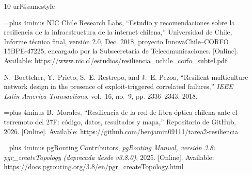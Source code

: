 \documentclass[conference]{IEEEtran}
\begin{document}
\begin{thebibliography}{10}
\providecommand{\url}[1]{#1}
\csname url@samestyle\endcsname
\providecommand{\newblock}{\relax}
\providecommand{\bibinfo}[2]{#2}
\providecommand{\BIBentrySTDinterwordspacing}{\spaceskip=0pt\relax}
\providecommand{\BIBentryALTinterwordstretchfactor}{4}
\providecommand{\BIBentryALTinterwordspacing}{\spaceskip=\fontdimen2\font plus
\BIBentryALTinterwordstretchfactor\fontdimen3\font minus
  \fontdimen4\font\relax}
\providecommand{\BIBforeignlanguage}[2]{{%
\expandafter\ifx\csname l@#1\endcsname\relax
\typeout{** WARNING: IEEEtran.bst: No hyphenation pattern has been}%
\typeout{** loaded for the language `#1'. Using the pattern for}%
\typeout{** the default language instead.}%
\else
\language=\csname l@#1\endcsname
\fi
#2}}
\providecommand{\BIBdecl}{\relax}
\BIBdecl

\BIBentryALTinterwordspacing
{NIC Chile Research Labs}, ``Estudio y recomendaciones sobre la resiliencia de
  la infraestructura de la internet chilena,'' Universidad de Chile, Informe
  técnico final, versión 2.0, Dec. 2018, proyecto InnovaChile--CORFO
  15BPE-47225, encargado por la Subsecretaría de Telecomunicaciones. [Online].
  Available:
  \url{https://www.nic.cl/estudios/resiliencia_uchile_corfo_subtel.pdf}
\BIBentrySTDinterwordspacing

N.~Boettcher, Y.~Prieto, S.~E. Restrepo, and J.~E. Pezoa, ``Resilient
  multiculture network design in the presence of exploit-triggered correlated
  failures,'' \emph{IEEE Latin America Transactions}, vol.~16, no.~9, pp.
  2336--2343, 2018.

\BIBentryALTinterwordspacing
B.~Morales, ``Resiliencia de la red de fibra {\'o}ptica chilena ante el
  terremoto del 27{F}: c{\'o}digo, datos, resultados y mapa,'' Repositorio de
  GitHub, 2026. [Online]. Available:
  \url{https://github.com/benjamin09111/tarea2-resiliencia}
\BIBentrySTDinterwordspacing

\BIBentryALTinterwordspacing
{pgRouting Contributors}, \emph{pgRouting Manual, versión 3.8:
  pgr\_createTopology (deprecada desde v3.8.0)}, 2025. [Online]. Available:
  \url{https://docs.pgrouting.org/3.8/en/pgr_createTopology.html}
\BIBentrySTDinterwordspacing


\end{thebibliography}
\end{document}
